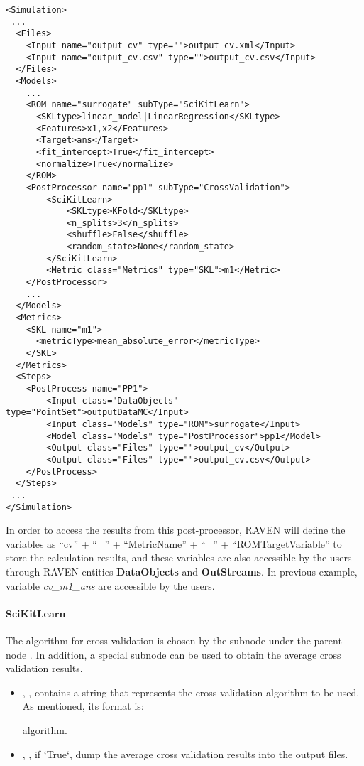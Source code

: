 \begin{lstlisting}[style=XML]
<Simulation>
 ...
  <Files>
    <Input name="output_cv" type="">output_cv.xml</Input>
    <Input name="output_cv.csv" type="">output_cv.csv</Input>
  </Files>
  <Models>
    ...
    <ROM name="surrogate" subType="SciKitLearn">
      <SKLtype>linear_model|LinearRegression</SKLtype>
      <Features>x1,x2</Features>
      <Target>ans</Target>
      <fit_intercept>True</fit_intercept>
      <normalize>True</normalize>
    </ROM>
    <PostProcessor name="pp1" subType="CrossValidation">
        <SciKitLearn>
            <SKLtype>KFold</SKLtype>
            <n_splits>3</n_splits>
            <shuffle>False</shuffle>
            <random_state>None</random_state>
        </SciKitLearn>
        <Metric class="Metrics" type="SKL">m1</Metric>
    </PostProcessor>
    ...
  </Models>
  <Metrics>
    <SKL name="m1">
      <metricType>mean_absolute_error</metricType>
    </SKL>
  </Metrics>
  <Steps>
    <PostProcess name="PP1">
        <Input class="DataObjects" type="PointSet">outputDataMC</Input>
        <Input class="Models" type="ROM">surrogate</Input>
        <Model class="Models" type="PostProcessor">pp1</Model>
        <Output class="Files" type="">output_cv</Output>
        <Output class="Files" type="">output_cv.csv</Output>
    </PostProcess>
  </Steps>
 ...
</Simulation>
\end{lstlisting}

In order to access the results from this post-processor, RAVEN will define the variables as ``cv'' +
``\_'' + ``MetricName'' + ``\_'' + ``ROMTargetVariable'' to store the calculation results, and these
variables are also accessible by the users through RAVEN entities \textbf{DataObjects} and \textbf{OutStreams}.
In previous example, variable \textit{cv\_m1\_ans} are accessible by the users.

\paragraph{SciKitLearn}

The algorithm for cross-validation is chosen by the subnode  under the parent node .
In addition, a special subnode  can be used to obtain the average cross validation results.

\begin{itemize}
  \item {}, , contains a string that
    represents the cross-validation algorithm to be used. As mentioned, its format is:

    algorithm.
  \item {}, , if `True`, dump the average cross validation results into the
    output files.
\end{itemize}


